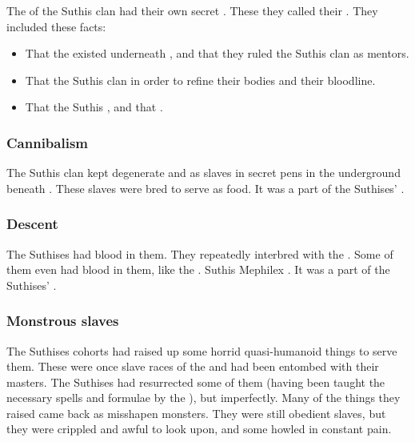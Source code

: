 \subsubsection{\Arcana}
The \rethyaxes of the Suthis clan had their own secret .
These they called their . 
They included these facts:

\begin{itemize}
  \item 
    That the \ophidian \liches existed underneath \Yormis, and that they ruled the Suthis clan as mentors.
  \item 
    That the Suthis clan  in order to refine their bodies and their bloodline.
  \item 
    That the Suthis \rethyaxes {}, and that .
\end{itemize}





\subsubsection{Cannibalism}
The Suthis clan kept degenerate \scathae and \humans as slaves in secret pens in the underground beneath \Yormis. 
These slaves were bred to serve as food. 
It was a part of the Suthises' .





\subsubsection{Descent}
The Suthises had \ophidian blood in them.
They repeatedly interbred with the \ophidians.
Some of them even had \xsic blood in them, like the \dragons. 
Suthis Mephilex . 
It was a part of the Suthises' .





\subsubsection{Monstrous slaves}
The Suthises cohorts had raised up some horrid quasi-humanoid things to serve them.
These were once slave races of the \ophidians and had been entombed with their masters.
The Suthises had resurrected some of them (having been taught the necessary spells and formulae by the \ophidians), but imperfectly.
Many of the things they raised came back as misshapen monsters. 
They were still obedient slaves, but they were crippled and awful to look upon, and some howled in constant pain. 





